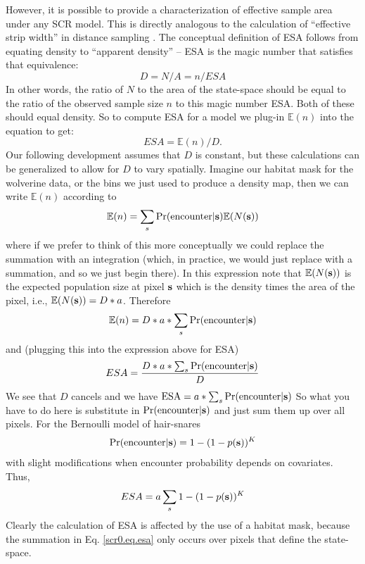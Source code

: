 {However, it is possible to provide a characterization of effective
sample area under any SCR model.
This is directly
analogous to the calculation of ``effective strip width'' in distance
sampling \citep{buckland_etal:2001, borchers_etal:2002}.
The conceptual definition of ESA follows from equating density to
``apparent density'' -- ESA is the magic number that satisfies that equivalence:
\[
 D = N/A   = n/ESA
\]
In other words, the ratio of $N$ to the area of the state-space should be
equal to the ratio of the observed sample size $n$ to this magic
number
ESA. Both of these should equal density.
So to compute ESA for a model we  plug-in $\mathbb{E}(n)$ into the equation to get:
\[
 ESA = \mathbb{E}(n)/D.
\]
Our following development assumes that $D$ is constant, but these
calculations can be generalized to allow for $D$ to vary spatially.
Imagine our habitat mask for the wolverine data, or the bins we just
used to produce a density map, then we can write $\mathbb{E}(n)$
according to
\[
\mathbb{E}(n) = \sum_{s}  \Pr(\mbox{encounter} | {\bf s}) \mathbb{E}(N({\bf s}) )
\]
where if we prefer to think of this more conceptually we could replace
the summation with an integration (which, in practice, we would just
replace with a summation, and so we just begin there).
In this expression note that
$\mathbb{E}(N({\bf s}))$ is the expected population size at pixel
${\bf s}$  which is the
density times the area of the pixel, i.e., $\mathbb{E}(N({\bf s}))=
D*a$.
Therefore
\[
 \mathbb{E}(n) = D*a* \sum_{s} \Pr(\mbox{encounter} | {\bf s})
\]
and (plugging this into the expression above for ESA)
\[
 ESA = \frac{D*a*\sum_{s} \Pr(\mbox{encounter} | {\bf s}) }{D}
\]
We see that $D$ cancels and we have
$\mbox{ESA} = a*\sum_{s} \Pr(\mbox{encounter} | {\bf s})$
So what you have to do here is substitute in $\Pr(\mbox{encounter}|
{\bf s})$ and just sum them up over all pixels.  For the Bernoulli model of hair-snares
\[
\Pr(\mbox{encounter}|{\bf s}) =    1-(1-p({\bf s}))^{K}
\]
with slight modifications when encounter probability depends on
covariates. Thus,
\begin{equation}
ESA = a  \sum_{s}   1-(1-p({\bf s}))^{K}
\label{scr0.eq.esa}
\end{equation}
Clearly the calculation of ESA is affected by the use of a
habitat mask, because the summation in Eq. \ref{scr0.eq.esa} only occurs over pixels
that define the state-space.

}
